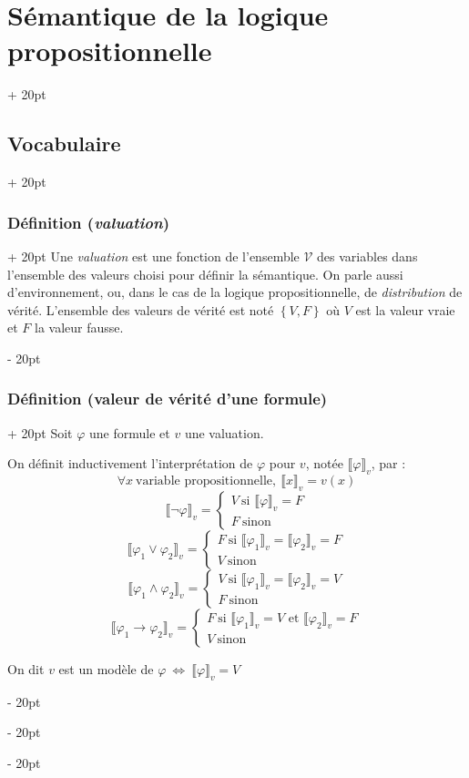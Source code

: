 \documentclass[a4paper, 12pt, twoside]{article}
\newcommand{\set}[1]{\left\{ #1 \right\}}
\newcommand{\ssi}{\ \Leftrightarrow \ }
\newcommand{\eqsys}[2]{\begin{cases} #1 \\ #2 \end{cases}}
\newcommand{\ind}[1][20pt]{\advance\leftskip + #1}
\newcommand{\deind}[1][20pt]{\advance\leftskip - #1}
\newenvironment{indt}[2][20pt]{#2 \par \ind[#1]}{\par \deind} %
\begin{document}
\begin{indt}{\section{Sémantique de la logique propositionnelle}}
\begin{indt}{\subsection{Vocabulaire}}
            \begin{indt}{\subsubsection{Définition (\textit{valuation})}}
                Une \textit{valuation} est une fonction de l'ensemble $\mathcal V$ des variables dans l'ensemble des valeurs choisi pour définir la sémantique. On parle aussi d'environnement, ou, dans le cas de la logique propositionnelle, de \textit{distribution} de vérité. L'ensemble des valeurs de vérité est noté $\set{V, F}$ où $V$ est la valeur vraie et $F$ la valeur fausse.
            \end{indt}
            
            \vspace{12pt}
            
            \begin{indt}{\subsubsection{Définition (valeur de vérité d'une formule)}}
                Soit $\varphi$ une formule et $v$ une valuation.
                
                On définit inductivement l'interprétation de $\varphi$ pour $v$, notée $\llbracket \varphi \rrbracket_v$, par :
                    \[ \forall x\ \text{variable propositionnelle},\ \llbracket x \rrbracket_v = v(x) \]
                    \[ \llbracket \neg \varphi \rrbracket_v = \eqsys{V\ \text{si $\llbracket \varphi \rrbracket_v = F$}}{F\ \text{sinon}} \]
                    \[ \llbracket \varphi_1 \vee \varphi_2 \rrbracket_v = \eqsys{F\ \text{si $\llbracket \varphi_1 \rrbracket_v = \llbracket \varphi_2 \rrbracket_v = F$}}{V\ \text{sinon}} \]
                    \[ \llbracket \varphi_1 \wedge \varphi_2 \rrbracket_v = \eqsys{V\ \text{si $\llbracket \varphi_1 \rrbracket_v = \llbracket \varphi_2 \rrbracket_v = V$}}{F\ \text{sinon}} \]
                    \[ \llbracket \varphi_1 \rightarrow \varphi_2 \rrbracket_v = \eqsys{F\ \text{si $\llbracket \varphi_1 \rrbracket_v = V$ et $\llbracket \varphi_2 \rrbracket_v = F$}}{V\ \text{sinon}} \]
                
                On dit $v$ est un modèle de $\varphi \ssi \llbracket \varphi \rrbracket_v = V$
            \end{indt}
            
            \vspace{12pt}
            

\end{indt}
\end{indt}
\end{document}
